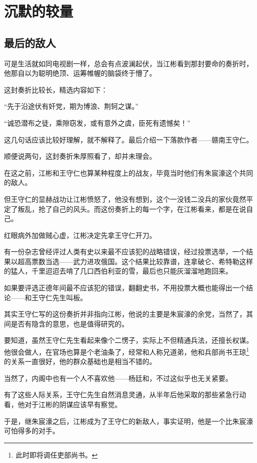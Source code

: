 \section{沉默的较量}
\ifnum{}
	\begin{multicols}{\theparacolNo}
		\fi
		\subsection{最后的敌人}
		可是生活就如同电视剧一样，总会有点波澜起伏，当江彬看到那封要命的奏折时，他那自以为聪明绝顶、运筹帷幄的脑袋终于懵了。

		这封奏折比较长，精选内容如下：

		“先于沿途伏有奸党，期为博浪、荆轲之谋。”

		“诚恐潜布之徒，乘隙窃发，或有意外之虞，臣死有遗憾矣！”

		这几句话应该比较好理解，就不解释了。最后介绍一下落款作者——赣南王守仁。

		顺便说两句，这封奏折朱厚照看了，却并未理会。

		在这之前，江彬和王守仁也算某种程度上的战友，毕竟当时他们有朱宸濠这个共同的敌人。

		但王守仁的显赫战功让江彬愤怒了，他没有想到，这个一没钱二没兵的家伙竟然平定了叛乱，抢了自己的风头。而这份奏折上的每一个字，在江彬看来，都是在说自己。

		红眼病外加做贼心虚，江彬决定先拿王守仁开刀。

		有一份杂志曾经评过人类有史以来最不应该犯的战略错误，经过投票选举，一个结果以超高票数当选——武力进攻俄国。这个结果比较靠谱，连拿破仑、希特勒这样的猛人，千里迢迢去啃了几口西伯利亚的雪，最后也只能灰溜溜地跑回来。

		如果要评选正德年间最不应该犯的错误，翻翻史书，不用投票大概也能得出一个结论——和王守仁先生叫板。

		其实王守仁写的这份奏折并非指向江彬，他说的主要是朱宸濠的余党，当然了，其间是否有隐含的意思，也是值得研究的。

		要知道，虽然王守仁先生看起来像个二愣子，实际上不但精通兵法，还擅长权谋。他很会做人，在官场也算是个老油条了，经常和人称兄道弟，他和兵部尚书王琼\footnote{此时即将调任吏部尚书。}的关系一直很好，他的群众基础也是相当不错的。

		当然了，内阁中也有一个人不喜欢他——杨廷和，不过这似乎也无关紧要。

		有了这些人际关系，王守仁先生自然消息灵通，从半年后他采取的那些紧急行动看，他对于江彬的阴谋应该早有察觉。

		于是，继朱宸濠之后，江彬成为了王守仁的新敌人，事实证明，他是一个比朱宸濠可怕得多的对手。


\end{multicols}
